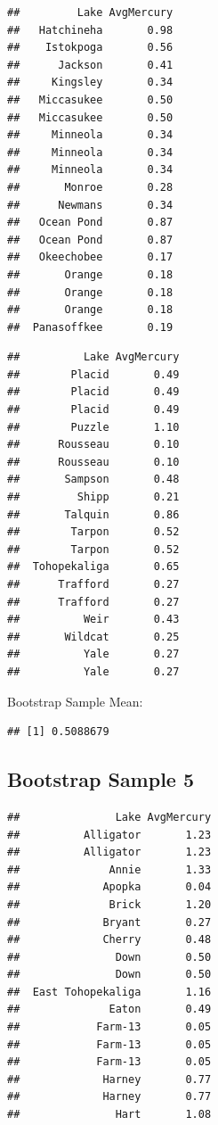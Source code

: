 \documentclass[]{book}
\newenvironment{Shaded}{\begin{snugshade}}{\end{snugshade}}
\newcommand{\KeywordTok}[1]{\textcolor[rgb]{0.13,0.29,0.53}{\textbf{#1}}}
\newcommand{\OperatorTok}[1]{\textcolor[rgb]{0.81,0.36,0.00}{\textbf{#1}}}
\newcommand{\NormalTok}[1]{#1}
\begin{document}
\begin{verbatim}
##         Lake AvgMercury
##   Hatchineha       0.98
##    Istokpoga       0.56
##      Jackson       0.41
##     Kingsley       0.34
##   Miccasukee       0.50
##   Miccasukee       0.50
##     Minneola       0.34
##     Minneola       0.34
##     Minneola       0.34
##       Monroe       0.28
##      Newmans       0.34
##   Ocean Pond       0.87
##   Ocean Pond       0.87
##   Okeechobee       0.17
##       Orange       0.18
##       Orange       0.18
##       Orange       0.18
##  Panasoffkee       0.19
\end{verbatim}

\begin{verbatim}
##          Lake AvgMercury
##        Placid       0.49
##        Placid       0.49
##        Placid       0.49
##        Puzzle       1.10
##      Rousseau       0.10
##      Rousseau       0.10
##       Sampson       0.48
##         Shipp       0.21
##       Talquin       0.86
##        Tarpon       0.52
##        Tarpon       0.52
##  Tohopekaliga       0.65
##      Trafford       0.27
##      Trafford       0.27
##          Weir       0.43
##       Wildcat       0.25
##          Yale       0.27
##          Yale       0.27
\end{verbatim}

Bootstrap Sample Mean:

\begin{Shaded}
\end{Shaded}

\begin{verbatim}
## [1] 0.5088679
\end{verbatim}

\subsection{Bootstrap Sample 5}\label{bootstrap-sample-5}

\begin{verbatim}
##               Lake AvgMercury
##          Alligator       1.23
##          Alligator       1.23
##              Annie       1.33
##             Apopka       0.04
##              Brick       1.20
##             Bryant       0.27
##             Cherry       0.48
##               Down       0.50
##               Down       0.50
##  East Tohopekaliga       1.16
##              Eaton       0.49
##            Farm-13       0.05
##            Farm-13       0.05
##            Farm-13       0.05
##             Harney       0.77
##             Harney       0.77
##               Hart       1.08
\end{verbatim}
\end{document}
